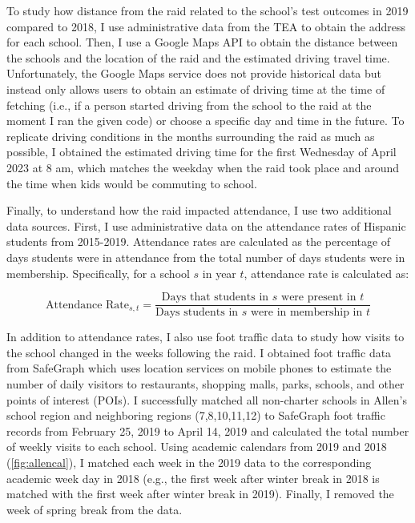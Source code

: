 \documentclass[hidelinks,twoside]{article}
\begin{document}
To study how distance from the raid related to the school's test outcomes in 2019 compared to 2018, I use administrative data from the TEA to obtain the address for each school. Then, I use a Google Maps API to obtain the distance between the schools and the location of the raid and the estimated driving travel time. Unfortunately, the Google Maps service does not provide historical data but instead only allows users to obtain an estimate of driving time at the time of fetching (i.e., if a person started driving from the school to the raid at the moment I ran the given code) or choose a specific day and time in the future. To replicate driving conditions in the months surrounding the raid as much as possible, I obtained the estimated driving time for the first Wednesday of April 2023 at 8 am, which matches the weekday when the raid took place and around the time when kids would be commuting to school. 

Finally, to understand how the raid impacted attendance, I use two additional data sources. First, I use administrative data on the attendance rates of Hispanic students from 2015-2019. Attendance rates are calculated as the percentage of days students were in attendance from the total number of days students were in membership. Specifically, for a school $s$ in year $t$, attendance rate is calculated as:

\begin{equation*}
\text{Attendance Rate}_{s,t} = \frac{\text{Days that students in $s$ were present in $t$}}{\text{Days students in $s$ were in membership in $t$}}
\end{equation*}

In addition to attendance rates, I also use foot traffic data to study how visits to the school changed in the weeks following the raid. I obtained foot traffic data from SafeGraph which uses location services on mobile phones to estimate the number of daily visitors to restaurants, shopping malls, parks, schools, and other points of interest (POIs). I successfully matched all non-charter schools in Allen's school region and neighboring regions (7,8,10,11,12) to SafeGraph foot traffic records from February 25, 2019 to April 14, 2019 and calculated the total number of weekly visits to each school. Using academic calendars from 2019 and 2018 (\autoref{fig:allencal}), I matched each week in the 2019 data to the corresponding academic week day in 2018 (e.g., the first week after winter break in 2018 is matched with the first week after winter break in 2019). Finally, I removed the week of spring break from the data. 
\end{document}
